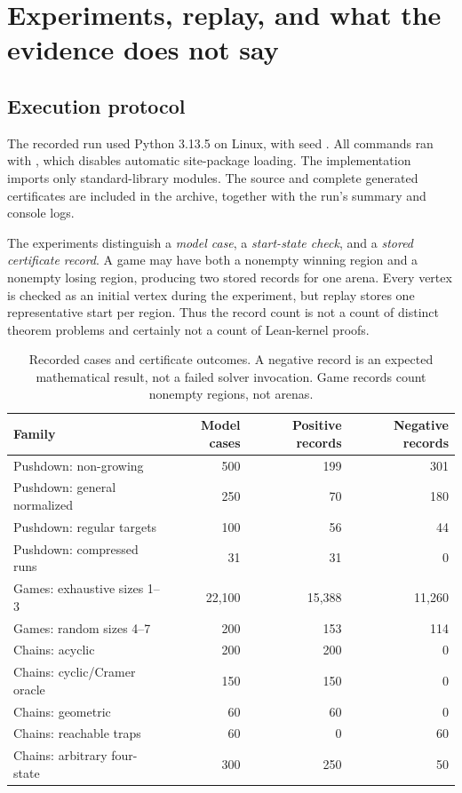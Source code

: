 \section{Experiments, replay, and what the evidence does not say}
\label{sec:experiments}

\subsection{Execution protocol}
The recorded run used Python 3.13.5 on Linux, with seed . All
commands ran with , which disables automatic site-package
loading. The implementation imports only standard-library modules. The source
and complete generated certificates are included in the archive, together with
the run's summary and console logs.

The experiments distinguish a \emph{model case}, a \emph{start-state check},
and a \emph{stored certificate record}. A game may have both a nonempty winning
region and a nonempty losing region, producing two stored records for one
arena. Every vertex is checked as an initial vertex during the experiment, but
replay stores one representative start per region. Thus the record count is
not a count of distinct theorem problems and certainly not a count of
Lean-kernel proofs.

\begin{table}[ht]
\centering\small
\begin{tabular}{@{}lrrr@{}}
\toprule
Family & Model cases & Positive records & Negative records \\
\midrule
Pushdown: non-growing & 500 & 199 & 301 \\
Pushdown: general normalized & 250 & 70 & 180 \\
Pushdown: regular targets & 100 & 56 & 44 \\
Pushdown: compressed runs & 31 & 31 & 0 \\
\midrule
Games: exhaustive sizes 1--3 & 22,100 & 15,388 & 11,260 \\
Games: random sizes 4--7 & 200 & 153 & 114 \\
\midrule
Chains: acyclic & 200 & 200 & 0 \\
Chains: cyclic/Cramer oracle & 150 & 150 & 0 \\
Chains: geometric & 60 & 60 & 0 \\
Chains: reachable traps & 60 & 0 & 60 \\
Chains: arbitrary four-state & 300 & 250 & 50 \\
\bottomrule
\end{tabular}
\caption{Recorded cases and certificate outcomes. A negative record is an
expected mathematical result, not a failed solver invocation. Game records
count nonempty regions, not arenas.}
\label{tab:counts}
\end{table}

